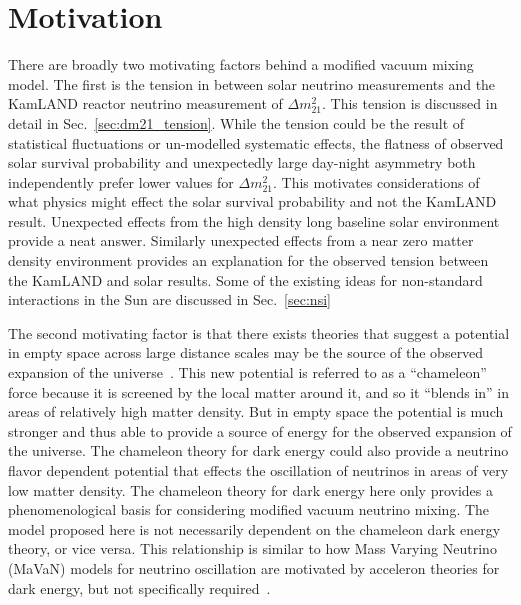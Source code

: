 \section{Motivation}
\label{sec:motivations}
There are broadly two motivating factors behind a modified vacuum mixing model.
The first is the tension in between solar neutrino measurements and 
the KamLAND reactor neutrino measurement of $\Delta m^{2}_{21}$.
This tension is discussed in detail in Sec.~\ref{sec:dm21_tension}.
While the tension could be the result of statistical fluctuations or un-modelled
systematic effects, the flatness of observed solar survival probability and
unexpectedly large day-night asymmetry both independently prefer lower values
for $\Delta m^{2}_{21}$.
This motivates considerations of what physics might effect the solar survival
probability and not the KamLAND result.
Unexpected effects from the high density long baseline solar environment provide a neat answer.
Similarly unexpected effects from a near zero matter density environment
provides an explanation for the observed tension between the KamLAND and solar
results.
Some of the existing ideas for non-standard interactions in the Sun are discussed
in Sec.~\ref{sec:nsi}

The second motivating factor is that there exists theories that
suggest a potential in empty space across large distance scales may be the source
of the observed expansion of the universe~\cite{khoury_chameleons}.
This new potential is referred to as a ``chameleon'' force because it
is screened by the local matter around it, and so it ``blends in'' in
areas of relatively high matter density.
But in empty space the potential is much stronger and thus able to provide
a source of energy for the observed expansion of the universe.
The chameleon theory for dark energy could also provide a neutrino flavor dependent
potential that effects the oscillation of neutrinos in areas of very low matter
density.
The chameleon theory for dark energy here only provides a phenomenological basis
for considering modified vacuum neutrino mixing. The model proposed here is
not necessarily dependent on the chameleon dark energy theory, or vice versa.
This relationship is similar to how Mass Varying Neutrino (MaVaN) models
for neutrino oscillation are motivated by acceleron theories for dark energy,
but not specifically required~\cite{mavans_cosmology}.


